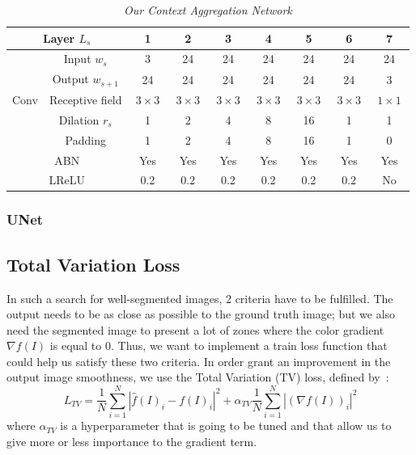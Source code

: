 \documentclass{article}
\begin{document}
            \begin{table}[!ht]
                \centering
                \begin{tabular}{|c|c||c|cccc|cc|}
                    \hline
                    \multicolumn{2}{|c||}{Layer $L_s$} & 1 & 2 & 3 & 4 & 5 & 6 & 7 \\
                    \hline
                    \hline
                     & Input $w_s$ & 3 & 24 & 24 & 24 & 24 & 24 & 24 \\
                     & Output $w_{s+1}$ & 24 & 24 & 24 & 24 & 24 & 24 & 3 \\
                    \cline{2-9}
                    Conv & Receptive field & $\ 3\times 3\ $ & $\ 3\times 3\ $ & $\ 3\times 3\ $ & $\ 3\times 3\ $ & $\ 3\times 3\ $ & $\ 3\times 3\ $ & $\ 1\times 1\ $ \\
                     & Dilation $r_s$ & 1 & 2 & 4 & 8 & 16 & 1 & 1 \\
                     & Padding & 1 & 2 & 4 & 8 & 16 & 1 & 0 \\
                    \hline
                    \multicolumn{2}{|c||}{ABN} & Yes & Yes & Yes & Yes & Yes & Yes & Yes \\
                    \hline
                    \multicolumn{2}{|c||}{LReLU} & 0.2 & 0.2 & 0.2 & 0.2 & 0.2 & 0.2 & No \\
                    \hline
                \end{tabular}
                \caption{\textit{Our Context Aggregation Network}}
            \end{table}

        \subsubsection{UNet}
            \cite{unet2015}
            \cite{todo:unet}

    \subsection{Total Variation Loss}
        In such a search for well-segmented images, 2 criteria have to be fulfilled. The output needs to be as close as possible to the ground truth image; but we also need the segmented image to present a lot of zones where the color gradient $\nabla f(I)$ is equal to $0$. Thus, we want to implement a train loss function that could help us satisfy these two criteria.
        In order grant an improvement in the output image smoothness, we use the Total Variation (TV) loss, defined by~\cite{tvloss}:
        $$
        L_{TV}=\frac{1}{N}\sum_{i=1}^N |\hat{f}(I)_i-f(I)_i|^2+\alpha_{TV}\frac{1}{N}\sum_{i=1}^N|(\nabla f(I))_i|^2
        $$
        where $\alpha_{TV}$ is a hyperparameter that is going to be tuned and that allow us to give more or less importance to the gradient term.
\end{document}
